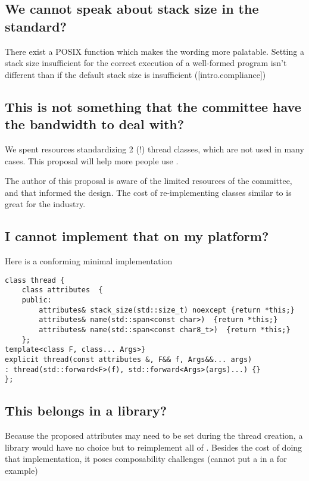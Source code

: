 \documentclass{wg21}
\begin{document}
\subsection{We cannot speak about stack size in the standard?}
There exist a POSIX function which makes the wording more palatable.
Setting a stack size insufficient for the correct execution of a well-formed program isn't different
than if the default stack size is insufficient ([intro.compliance])

\subsection{This is not something that the committee have the bandwidth to deal with?}

We spent resources standardizing 2 (!) thread classes, which are not used in many cases.
This proposal will help more people use .

The author of this proposal is aware of the limited resources of the committee, and that informed the design.
The cost of re-implementing classes similar to  is great for the industry.

\subsection{I cannot implement that on my platform?}
Here is a conforming minimal implementation

\begin{lstlisting}[style=MY]
class thread {
    class attributes  {
    public:  
        attributes& stack_size(std::size_t) noexcept {return *this;}
        attributes& name(std::span<const char>)  {return *this;}
        attributes& name(std::span<const char8_t>)  {return *this;}
    };
template<class F, class... Args>}
explicit thread(const attributes &, F&& f, Args&&... args)
: thread(std::forward<F>(f), std::forward<Args>(args)...) {}
};
\end{lstlisting}

\subsection{This belongs in a library?}

Because the proposed attributes may need to be set during the thread creation, a library would have no choice but
to reimplement all of .
Besides the cost of doing that implementation, it poses composability challenges (cannot put a  in a  for example)
\end{document}
